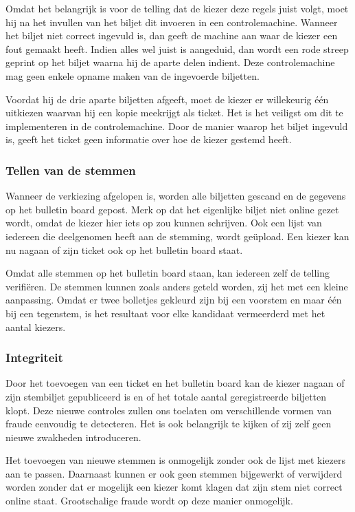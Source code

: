 \npar Omdat het belangrijk is voor de telling dat de kiezer deze regels juist volgt, moet hij na het invullen van het biljet dit invoeren in een controlemachine. Wanneer het biljet niet correct ingevuld is, dan geeft de machine aan waar de kiezer een fout gemaakt heeft. Indien alles wel juist is aangeduid, dan wordt een rode streep geprint op het biljet waarna hij de aparte delen indient. Deze controlemachine mag geen enkele opname maken van de ingevoerde biljetten.

\npar Voordat hij de drie aparte biljetten afgeeft, moet de kiezer er willekeurig \'e\'en uitkiezen waarvan hij een kopie meekrijgt als ticket. Het is het veiligst om dit te implementeren in de controlemachine. Door de manier waarop het biljet ingevuld is, geeft het ticket geen informatie over hoe de kiezer gestemd heeft.

\subsubsection{Tellen van de stemmen}

Wanneer de verkiezing afgelopen is, worden alle biljetten gescand en de gegevens op het bulletin board gepost. Merk op dat het eigenlijke biljet niet online gezet wordt, omdat de kiezer hier iets op zou kunnen schrijven. Ook een lijst van iedereen die deelgenomen heeft aan de stemming, wordt ge\"upload. Een kiezer kan nu nagaan of zijn ticket ook op het bulletin board staat.

\npar Omdat alle stemmen op het bulletin board staan, kan iedereen zelf de telling verifi\"eren. De stemmen kunnen zoals anders geteld worden, zij het met een kleine aanpassing. Omdat er twee bolletjes gekleurd zijn bij een voorstem en maar \'e\'en bij een tegenstem, is het resultaat voor elke kandidaat vermeerderd met het aantal kiezers.

\subsubsection{Integriteit}
\label{sec:ls:integriteit}

Door het toevoegen van een ticket en het bulletin board kan de kiezer nagaan of zijn stembiljet gepubliceerd is en of het totale aantal geregistreerde biljetten klopt. Deze nieuwe controles zullen ons toelaten om verschillende vormen van fraude eenvoudig te detecteren. Het is ook belangrijk te kijken of zij zelf geen nieuwe zwakheden introduceren.

\npar Het toevoegen van nieuwe stemmen is onmogelijk zonder ook de lijst met kiezers aan te passen. Daarnaast kunnen er ook geen stemmen bijgewerkt of verwijderd worden zonder dat er mogelijk een kiezer komt klagen dat zijn stem niet correct online staat. Grootschalige fraude wordt op deze manier onmogelijk.

